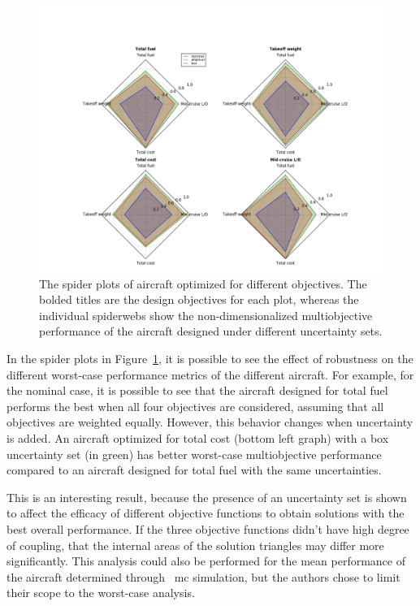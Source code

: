 \begin{figure}
    \includegraphics[width = 0.95\linewidth]{figures/4objradar.png}
    \caption{The spider plots of aircraft optimized for different objectives.
    The bolded titles are the design objectives for each plot, whereas the individual spiderwebs
    show the non-dimensionalized multiobjective performance of the aircraft designed under different
    uncertainty sets.}
    \label{fig:spider}
\end{figure}

In the spider plots in Figure~\ref{fig:spider}, it is possible to see the effect of robustness on
the different worst-case performance metrics of the different aircraft.
For example, for the nominal case, it is possible to see that
the aircraft designed for total fuel performs the best when all four objectives are considered,
assuming that all objectives are weighted equally.
However, this behavior changes when uncertainty is added. An aircraft optimized for total cost
(bottom left graph) with a box uncertainty set (in green) has better worst-case multiobjective performance
compared to an aircraft designed for total fuel with the same uncertainties.

This is an interesting result, because the presence of an uncertainty set is
shown to affect the efficacy of different objective functions to obtain solutions
with the best overall performance. If the three objective functions didn't
have high degree of coupling, that the internal areas of the solution triangles may differ
more significantly. This analysis could also be performed for the mean performance
of the aircraft determined through ~\gls{mc} simulation, but the authors chose
to limit their scope to the worst-case analysis.

